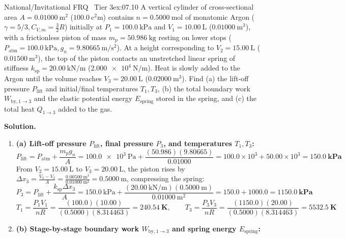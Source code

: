 \begin{workedexample}{National/Invitational FRQ \textbar\ Tier 3}{ex:07.10}
A vertical cylinder of cross-sectional area $A = \SI{0.01000}{\square\meter}$ ($\SI{100.0}{\square\centi\meter}$) contains $n = \SI{0.5000}{\mole}$ of monatomic Argon ($\gamma = 5/3, C_{V,m} = \frac{3}{2}R$) initially at $P_1 = \SI{100.0}{\kilo\pascal}$ and $V_1 = \SI{10.00}{\liter}$ ($\SI{0.01000}{\cubic\meter}$), with a frictionless piston of mass $m_p = \SI{50.986}{\kilogram}$ resting on lower stops ($P_{\mathrm{atm}} = \SI{100.0}{\kilo\pascal}, g_n = \SI{9.80665}{\meter\per\square\second}$). At a height corresponding to $V_2 = \SI{15.00}{\liter}$ ($\SI{0.01500}{\cubic\meter}$), the top of the piston contacts an unstretched linear spring of stiffness $k_{\mathrm{sp}} = \SI{20.00}{\kilo\newton\per\meter}$ ($\SI{2.000e4}{\newton\per\meter}$). Heat is slowly added to the Argon until the volume reaches $V_3 = \SI{20.00}{\liter}$ ($\SI{0.02000}{\cubic\meter}$). Find (a) the lift-off pressure $P_{\mathrm{lift}}$ and initial/final temperatures $T_1, T_3$, (b) the total boundary work $W_{\mathrm{by},1\to 3}$ and the elastic potential energy $E_{\mathrm{spring}}$ stored in the spring, and (c) the total heat $Q_{1\to 3}$ added to the gas.
\par\smallskip\noindent
\textbf{Solution.}
\begin{enumerate}
  \item \textbf{(a) Lift-off pressure $P_{\mathrm{lift}}$, final pressure $P_3$, and temperatures $T_1, T_3$:}
  \[
    P_{\mathrm{lift}} = P_{\mathrm{atm}} + \frac{m_p g_n}{A} = \SI{100.0e3}{\pascal} + \frac{(50.986)(9.80665)}{0.01000} = 100.0\times 10^3 + 50.00\times 10^3 = \mathbf{\SI{150.0}{\kilo\pascal}}
  \]
  From $V_2 = \SI{15.00}{\liter}$ to $V_3 = \SI{20.00}{\liter}$, the piston rises by $\Delta x_3 = \frac{V_3 - V_2}{A} = \frac{\SI{0.00500}{\cubic\meter}}{\SI{0.01000}{\square\meter}} = \SI{0.5000}{\meter}$, compressing the spring:
  \[
    P_3 = P_{\mathrm{lift}} + \frac{k_{\mathrm{sp}}\Delta x_3}{A} = \SI{150.0}{\kilo\pascal} + \frac{(\SI{20.00}{\kilo\newton\per\meter})(\SI{0.5000}{\meter})}{\SI{0.01000}{\square\meter}} = 150.0 + 1000.0 = \mathbf{\SI{1150.0}{\kilo\pascal}}
  \]
  \[
    T_1 = \frac{P_1 V_1}{nR} = \frac{(100.0)(10.00)}{(0.5000)(8.314463)} = \mathbf{\SI{240.54}{\kelvin}}, \qquad T_3 = \frac{P_3 V_3}{nR} = \frac{(1150.0)(20.00)}{(0.5000)(8.314463)} = \mathbf{\SI{5532.5}{\kelvin}}
  \]
  \item \textbf{(b) Stage-by-stage boundary work $W_{\mathrm{by},1\to 3}$ and spring energy $E_{\mathrm{spring}}$:}

\end{enumerate}
\end{workedexample}
